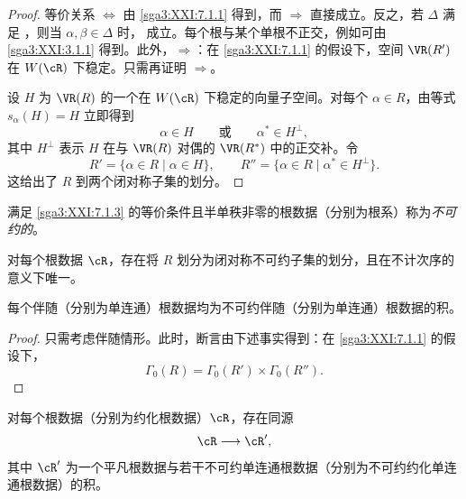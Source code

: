 \begin{proof}
等价关系 \(\Leftrightarrow\) 由 \ref{sga3:XXI:7.1.1} 得到，而 \(\Rightarrow\) 直接成立。反之，若 \(\Delta\) 满足 ，则当 \(\alpha,\beta\in\Delta\) 时， 成立。每个根与某个单根不正交，例如可由 \ref{sga3:XXI:3.1.1} 得到。此外，\(\Rightarrow\)：在 \ref{sga3:XXI:7.1.1} 的假设下，空间 \(\VR(R')\) 在 \(W(\cR)\) 下稳定。只需再证明 \(\Rightarrow\)。

设 \(H\) 为 \(\VR(R)\) 的一个在 \(W(\cR)\) 下稳定的向量子空间。对每个 \(\alpha\in R\)，由等式 \(s_\alpha(H)=H\) 立即得到
\[
 \alpha\in H
 \qquad\text{或}\qquad
 \alpha^\ast\in H^\perp,
\]
其中 \(H^\perp\) 表示 \(H\) 在与 \(\VR(R)\) 对偶的 \(\VR(R^\ast)\) 中的正交补。令
\[
 R'=\{\alpha\in R\mid\alpha\in H\},
 \qquad
 R''=\{\alpha\in R\mid\alpha^\ast\in H^\perp\}.
\]
这给出了 \(R\) 到两个闭对称子集的划分。
\end{proof}

\begin{definition}\label{sga3:XXI:7.1.4}
满足 \ref{sga3:XXI:7.1.3} 的等价条件且半单秩非零的根数据（分别为根系）称为\emph{不可约的}。
\end{definition}

\begin{corollary}\label{sga3:XXI:7.1.5}
对每个根数据 \(\cR\)，存在将 \(R\) 划分为闭对称不可约子集的划分，且在不计次序的意义下唯一。
\end{corollary}

\begin{corollary}\label{sga3:XXI:7.1.6}
每个伴随（分别为单连通）根数据均为不可约伴随（分别为单连通）根数据的积。
\end{corollary}

\begin{proof}
只需考虑伴随情形。此时，断言由下述事实得到：在 \ref{sga3:XXI:7.1.1} 的假设下，
\[
 \Gamma_0(R)=\Gamma_0(R')\times\Gamma_0(R'').
\]
\end{proof}

\begin{corollary}\label{sga3:XXI:7.1.7}
对每个根数据（分别为约化根数据）\(\cR\)，存在同源
\[
 \cR\longrightarrow\cR',
\]
其中 \(\cR'\) 为一个平凡根数据与若干不可约单连通根数据（分别为不可约约化单连通根数据）的积。
\end{corollary}


